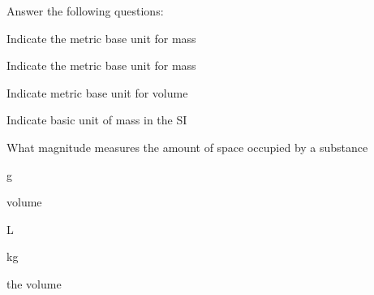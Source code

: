 \documentclass[main.tex]{subfiles}
\begin{document}
\begin{multicols*}{2}
\begin{question}[ID=\the\value{numA}]
Answer the following questions:
\begin{inparaenum}[(a)]
\item Indicate the metric base unit for mass %
\item Indicate the metric base unit for mass %
\item Indicate metric base unit for volume %
\item Indicate basic unit of mass in the SI %
\item What magnitude measures the amount of space occupied by a substance
\end{inparaenum}
\end{question}
\begin{solution}
\begin{inparaenum}[(a)]
\item    g 
\item     volume 
\item     L 
\item kg
\item the volume
\end{inparaenum}
\hspace{0.1cm}\end{solution}









%
%








\end{multicols*}
\end{document}
